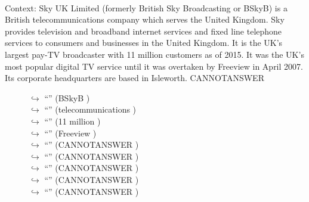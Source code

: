 \documentclass[11pt,a4paper, onecolumn]{article}
\begin{document}
\\ Context: Sky UK Limited (formerly British Sky Broadcasting or BSkyB) is a British telecommunications company which serves the United Kingdom. Sky provides television and broadband internet services and fixed line telephone services to consumers and businesses in the United Kingdom. It is the UK's largest pay-TV broadcaster with 11 million customers as of 2015. It was the UK's most popular digital TV service until it was overtaken by Freeview in April 2007. Its corporate headquarters are based in Isleworth. CANNOTANSWER

\begin{figure}[t] \small \begin{tcolorbox}[boxsep=0pt,left=5pt,right=0pt,top=2pt,colback = yellow!5] \begin{dialogue}
 \small 
\colorbox{pink!25}{$\hookrightarrow$}
{ ``'' (BSkyB ) }
\\
\colorbox{pink!25}{$\hookrightarrow$}
{ ``'' (telecommunications ) }
\\
\colorbox{pink!25}{$\hookrightarrow$}
{ ``'' (11 million ) }
\\
\colorbox{pink!25}{$\hookrightarrow$}
{ ``'' (Freeview ) }
\\
\colorbox{pink!25}{$\hookrightarrow$}
{ ``'' (CANNOTANSWER ) }
\\
\colorbox{pink!25}{$\hookrightarrow$}
{ ``'' (CANNOTANSWER ) }
\\
\colorbox{pink!25}{$\hookrightarrow$}
{ ``'' (CANNOTANSWER ) }
\\
\colorbox{pink!25}{$\hookrightarrow$}
{ ``'' (CANNOTANSWER ) }
\\
\colorbox{pink!25}{$\hookrightarrow$}
{ ``'' (CANNOTANSWER ) }
\\
 \end{dialogue}\end{tcolorbox}\end{figure}
\end{document}
